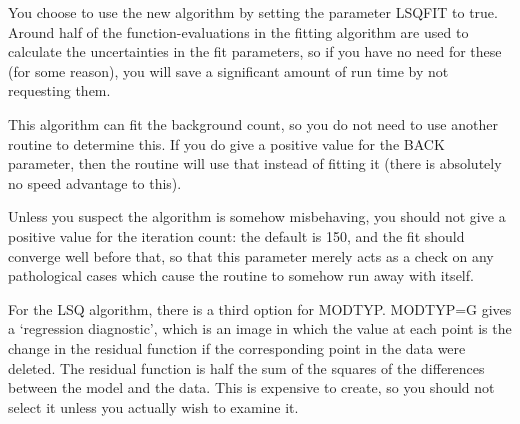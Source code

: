 \documentclass[twoside,11pt]{article}
\begin{document}
You choose to use the new algorithm by setting the parameter LSQFIT to
true.  Around half of the function-evaluations in the fitting
algorithm are used to calculate the uncertainties in the fit
parameters, so if you have no need for these (for some reason), you
will save a significant amount of run time by not requesting them.

This algorithm can fit the background count, so you do not need to use
another routine to determine this.  If you do give a positive value
for the BACK parameter, then the routine will use that instead of
fitting it (there is absolutely no speed advantage to this).

Unless you suspect the algorithm is somehow misbehaving, you should
not give a positive value for the iteration count: the default is 150,
and the fit should converge well before that, so that this parameter
merely acts as a check on any pathological cases which cause the
routine to somehow run away with itself.

For the LSQ algorithm, there is a third option for MODTYP.  MODTYP=G
gives a `regression diagnostic', which is an image in which the value
at each point is the change in the residual function if the
corresponding point in the data were deleted.  The residual function
is half the sum of the squares of the differences between the model
and the data.  This is expensive to create, so you should not 
select it unless you actually wish to examine it.
\end{document}
